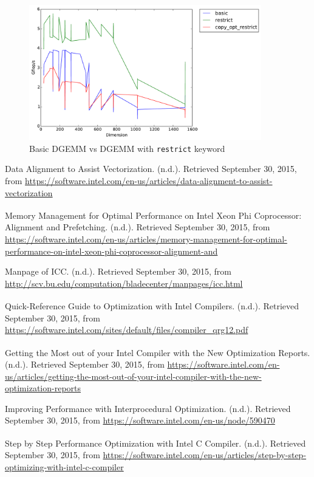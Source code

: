 \documentclass[11pt]{article}
\begin{document}
\begin{figure}[H]
    \includegraphics[width=0.9\textwidth]{timing_copy_opt_restrict.pdf}
    \caption{Basic DGEMM vs DGEMM with \texttt{restrict} keyword}
    \label{restrict_copy_opt}
\end{figure} 


\begin{thebibliography}{9}
Data Alignment to Assist Vectorization. (n.d.). Retrieved September 30, 2015, from \url{https://software.intel.com/en-us/articles/data-alignment-to-assist-vectorization}
 
Memory Management for Optimal Performance on Intel\textsuperscript{\textregistered} Xeon Phi\textsuperscript{\texttrademark} Coprocessor: Alignment and Prefetching. (n.d.). Retrieved September 30, 2015, from \url{https://software.intel.com/en-us/articles/memory-management-for-optimal-performance-on-intel-xeon-phi-coprocessor-alignment-and}

Manpage of ICC. (n.d.). Retrieved September 30, 2015, from \url{http://scv.bu.edu/computation/bladecenter/manpages/icc.html}
 
Quick-Reference Guide to Optimization with Intel\textsuperscript{\textregistered} Compilers. (n.d.). Retrieved September 30, 2015, from \url{https://software.intel.com/sites/default/files/compiler_qrg12.pdf}

Getting the Most out of your Intel\textsuperscript{\textregistered} Compiler with the New Optimization Reports. (n.d.). Retrieved September 30, 2015, from \url{https://software.intel.com/en-us/articles/getting-the-most-out-of-your-intel-compiler-with-the-new-optimization-reports}

Improving Performance with Interprocedural Optimization. (n.d.). Retrieved September 30, 2015, from \url{https://software.intel.com/en-us/node/590470}

Step by Step Performance Optimization with Intel\textsuperscript{\textregistered} C Compiler. (n.d.). Retrieved September 30, 2015, from \url{https://software.intel.com/en-us/articles/step-by-step-optimizing-with-intel-c-compiler}



\end{thebibliography}

 
 
\end{document}

